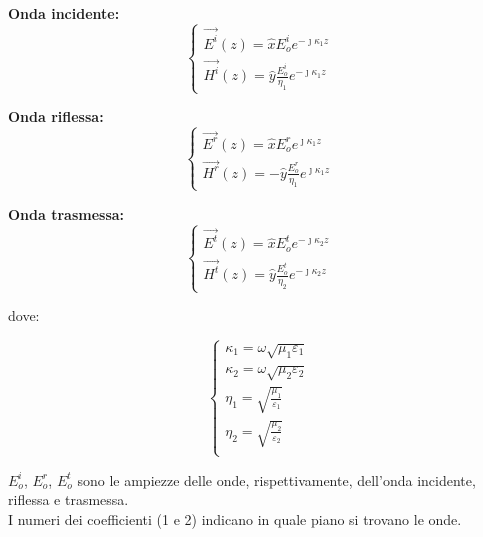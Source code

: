 \textbf{Onda incidente:} 
{\Large \begin{equation}
    \begin{cases}
        \vec{E^{i}}(z) = \hat{x} E_o ^{i} e^{-\jmath \kappa_1 z} \\ 
        \vec{H^{i}}(z) = \hat{y} \frac{E_o ^{i}}{\eta_1} e^{-\jmath \kappa_1 z}  
    \end{cases}
\end{equation}}


\textbf{Onda riflessa:} 
{\Large \begin{equation}
    \begin{cases}
        \vec{E^{r}}(z) = \hat{x} E_o ^{r} e^{\jmath \kappa_1 z} \\ 
        \vec{H^{r}}(z) = -\hat{y} \frac{E_o ^{r}}{\eta_1} e^{\jmath \kappa_1 z}  
    \end{cases}
\end{equation}}

\textbf{Onda trasmessa:} 
{\Large \begin{equation}
    \begin{cases}
        \vec{E^{t}}(z) = \hat{x} E_o ^{t} e^{-\jmath \kappa_2 z} \\ 
        \vec{H^{t}}(z) = \hat{y} \frac{E_o ^{t}}{\eta_2} e^{-\jmath \kappa_2 z}  
    \end{cases}
\end{equation}}

dove: 

{\Large \begin{equation}
    \begin{cases}
        \kappa_1 = \omega \sqrt{\mu_1 \varepsilon_1} \\ 
        \kappa_2 = \omega \sqrt{\mu_2 \varepsilon_2} \\ 
        \eta_1 = \sqrt{\frac{\mu_1}{\varepsilon_1}} \\ 
        \eta_2 = \sqrt{\frac{\mu_2}{\varepsilon_2}} \\ 
    \end{cases}
\end{equation}}

$E_o ^{i}$, $E_o ^{r}$,  $E_o ^{t}$ sono le ampiezze delle onde, rispettivamente, dell'onda incidente, riflessa e trasmessa. \\ 

I numeri dei coefficienti (1 e 2) indicano in quale piano si trovano le onde. \\ \\ 

